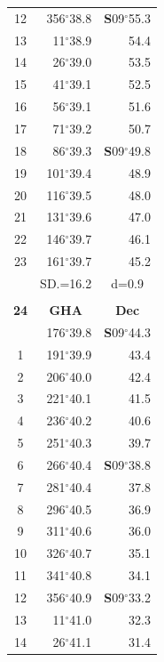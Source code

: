 \documentclass[10pt, a4paper]{report}
\begin{document}
\begin{scriptsize}
\begin{tabular*}{0.2\textwidth}[t]{@{\extracolsep{\fill}}|c|rr|}
12 & 356$^\circ$38.8 & \textbf{S}09$^\circ$55.3\\
13 & 11$^\circ$38.9 & 54.4\\
14 & 26$^\circ$39.0 & 53.5\\
15 & 41$^\circ$39.1 & \raisebox{0.24ex}{\boldmath$\cdot$~\boldmath$\cdot$~~}52.5\\
16 & 56$^\circ$39.1 & 51.6\\
17 & 71$^\circ$39.2 & 50.7\\[2Pt]
18 & 86$^\circ$39.3 & \textbf{S}09$^\circ$49.8\\
19 & 101$^\circ$39.4 & 48.9\\
20 & 116$^\circ$39.5 & 48.0\\
21 & 131$^\circ$39.6 & \raisebox{0.24ex}{\boldmath$\cdot$~\boldmath$\cdot$~~}47.0\\
22 & 146$^\circ$39.7 & 46.1\\
23 & 161$^\circ$39.7 & 45.2\\
\hline
\rule{0pt}{2.4ex} & \multicolumn{1}{c}{SD.=16.2} & \multicolumn{1}{c|}{d=0.9}\\
\hline
\multicolumn{1}{c}{}\\[-0.5ex]\hline
\multicolumn{1}{|c|}{\rule{0pt}{2.6ex}\textbf{24}} & \multicolumn{1}{c}{\textbf{GHA}} & \multicolumn{1}{c|}{\textbf{Dec}}\\
\hline\rule{0pt}{2.6ex}\noindent
0 & 176$^\circ$39.8 & \textbf{S}09$^\circ$44.3\\
1 & 191$^\circ$39.9 & 43.4\\
2 & 206$^\circ$40.0 & 42.4\\
3 & 221$^\circ$40.1 & \raisebox{0.24ex}{\boldmath$\cdot$~\boldmath$\cdot$~~}41.5\\
4 & 236$^\circ$40.2 & 40.6\\
5 & 251$^\circ$40.3 & 39.7\\[2Pt]
6 & 266$^\circ$40.4 & \textbf{S}09$^\circ$38.8\\
7 & 281$^\circ$40.4 & 37.8\\
8 & 296$^\circ$40.5 & 36.9\\
9 & 311$^\circ$40.6 & \raisebox{0.24ex}{\boldmath$\cdot$~\boldmath$\cdot$~~}36.0\\
10 & 326$^\circ$40.7 & 35.1\\
11 & 341$^\circ$40.8 & 34.1\\[2Pt]
12 & 356$^\circ$40.9 & \textbf{S}09$^\circ$33.2\\
13 & 11$^\circ$41.0 & 32.3\\
14 & 26$^\circ$41.1 & 31.4\\

\end{tabular*}
\end{scriptsize}
\end{document}
